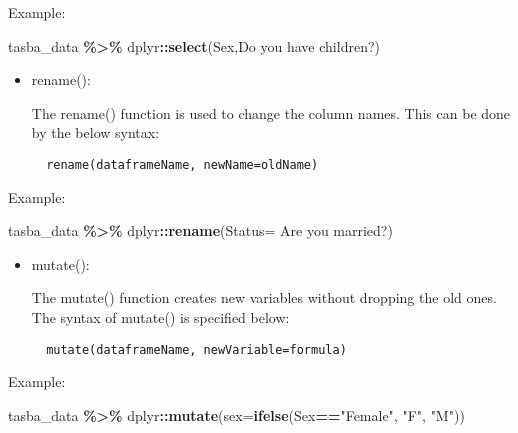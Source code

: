 \documentclass[
]{book}
\newenvironment{Shaded}{\begin{snugshade}}{\end{snugshade}}
\newcommand{\AttributeTok}[1]{\textcolor[rgb]{0.13,0.29,0.53}{#1}}
\newcommand{\FunctionTok}[1]{\textcolor[rgb]{0.13,0.29,0.53}{\textbf{#1}}}
\newcommand{\NormalTok}[1]{#1}
\newcommand{\SpecialCharTok}[1]{\textcolor[rgb]{0.81,0.36,0.00}{\textbf{#1}}}
\newcommand{\StringTok}[1]{\textcolor[rgb]{0.31,0.60,0.02}{#1}}
\begin{document}
Example:

\begin{Shaded}
\begin{Highlighting}[]
\NormalTok{tasba\_data }\SpecialCharTok{\%\textgreater{}\%} 
\NormalTok{  dplyr}\SpecialCharTok{::}\FunctionTok{select}\NormalTok{(Sex,}\StringTok{\textasciigrave{}}\AttributeTok{Do you  have children?}\StringTok{\textasciigrave{}}\NormalTok{)}
\end{Highlighting}
\end{Shaded}

\begin{itemize}
\item
  rename():

  The rename() function is used to change the column names. This can be done by the below syntax:

\begin{verbatim}
  rename(dataframeName, newName=oldName)
\end{verbatim}
\end{itemize}

Example:

\begin{Shaded}
\begin{Highlighting}[]
\NormalTok{tasba\_data }\SpecialCharTok{\%\textgreater{}\%}
\NormalTok{  dplyr}\SpecialCharTok{::}\FunctionTok{rename}\NormalTok{(}\AttributeTok{Status=} \StringTok{\textasciigrave{}}\AttributeTok{Are you married?}\StringTok{\textasciigrave{}}\NormalTok{)}
\end{Highlighting}
\end{Shaded}

\begin{itemize}
\item
  mutate():

  The mutate() function creates new variables without dropping the old ones. The syntax of mutate() is specified below:

\begin{verbatim}
  mutate(dataframeName, newVariable=formula)
\end{verbatim}
\end{itemize}

Example:

\begin{Shaded}
\begin{Highlighting}[]
\NormalTok{tasba\_data }\SpecialCharTok{\%\textgreater{}\%}
\NormalTok{  dplyr}\SpecialCharTok{::}\FunctionTok{mutate}\NormalTok{(}\AttributeTok{sex=}\FunctionTok{ifelse}\NormalTok{(Sex}\SpecialCharTok{==}\StringTok{"Female"}\NormalTok{, }\StringTok{"F"}\NormalTok{, }\StringTok{"M"}\NormalTok{))}
\end{Highlighting}
\end{Shaded}
\end{document}
